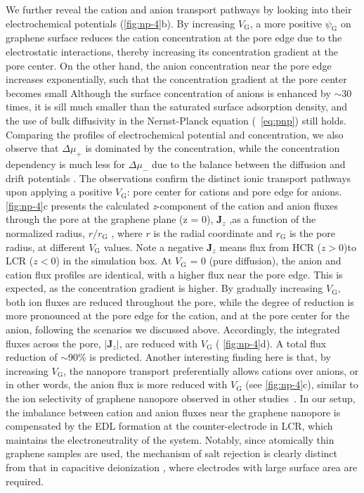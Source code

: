 We further reveal the cation and anion transport pathways by looking
into their electrochemical potentials (\autoref{fig:np-4}b). By
increasing $V_{\mathrm{G}}$, a more positive $\psi_{\mathrm{G}}$ on
graphene surface reduces the cation concentration at the pore edge due
to the electrostatic interactions, thereby increasing its
concentration gradient at the pore center. On the other hand, the
anion concentration near the pore edge increases exponentially, such
that the concentration gradient at the pore center becomes small
%
Although the surface
concentration of anions is enhanced by $\sim{}$30 times, it is sill
much smaller than the saturated surface adsorption density, and the use of
bulk diffusivity in the Nernst-Planck equation (~\autoref{eq:pnp}) still holds.
%
Comparing the profiles of electrochemical potential and concentration,
we also observe that $\Delta \mu_{+}$ is dominated by the
concentration, while the concentration dependency is much
less for $\Delta \mu_{-}$ due to the
balance between the diffusion and drift potentials .
%
The
observations confirm the distinct ionic transport pathways upon
applying a positive $V_{\mathrm{G}}$: pore center for cations and pore
edge for anions.
%
\autoref{fig:np-4}c presents the calculated \textit{z}-component of
the cation and anion fluxes through the pore at the graphene plane (z
= 0), $\symbf{J}_{z}$ ,as a function of the normalized radius,
$r/r_{\mathrm{G}}$ , where $r$ is the radial coordinate and
$r_{\mathrm{G}}$ is the pore radius, at different $V_{\mathrm{G}}$
values. Note a negative $\symbf{J}_{z}$ means flux from HCR ($z>0$)to LCR ($z<0$) in the simulation box. 
%
At $V_{\mathrm{G}}$ = 0 (pure
diffusion), the anion and cation flux profiles are identical, with a
higher flux near the pore edge.
This is expected, as the
concentration gradient is higher.
%
By gradually increasing
$V_{\mathrm{G}}$, both ion fluxes are reduced throughout the pore, while
the degree of reduction is more pronounced at the pore edge for the
cation, and at the pore center for the anion, following the scenarios
we discussed above. Accordingly, the integrated fluxes across the
pore, $|\symbf{J}_{z}|$, are reduced with $V_{\mathrm{G}}$ (
\autoref{fig:np-4}d). A total flux reduction of $\sim$90\% is
predicted. Another interesting finding here is that, by increasing
$V_{\mathrm{G}}$, the nanopore transport preferentially allows cations
over anions, or in other words, the anion flux is more reduced with
$V_{\mathrm{G}}$ (see \autoref{fig:np-4}c), similar to the ion
selectivity of graphene nanopore observed in other studies~\cite{Rollings_2016_gating}.
%
In our
setup, the imbalance between cation and anion fluxes near the graphene
nanopore is compensated by the EDL formation at the counter-electrode
in LCR, which maintains the electroneutrality of the system. Notably,
since atomically thin graphene samples are used, the mechanism of salt
rejection is clearly distinct from that in capacitive deionization
\cite{Biesheuvel_2010_desalin_theory}, where electrodes with large
surface area are required.


